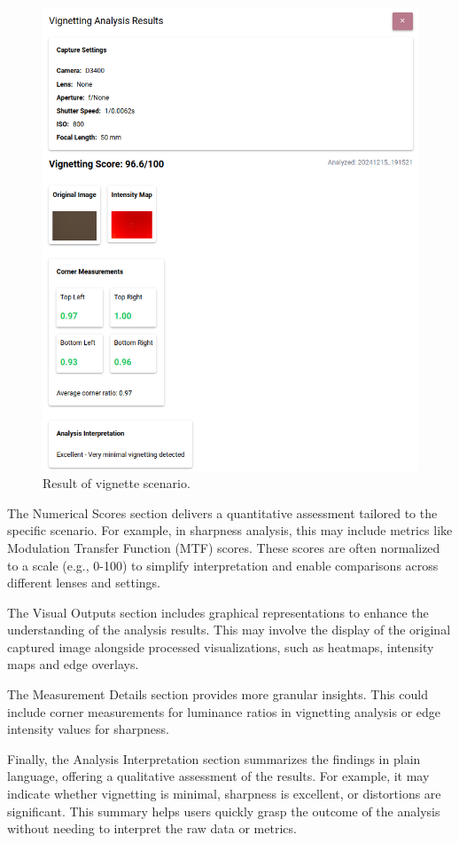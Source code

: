 \begin{figure}[hbt]
\centering
\includegraphics[height=0.8\textwidth]{Images/scenario_result.png}
\caption{Result of vignette scenario.}
\label{fig:ui_scenario_result}
\end{figure}

The Numerical Scores section delivers a quantitative assessment tailored to the specific scenario. For example, in sharpness analysis, this may include metrics like Modulation Transfer Function (MTF) scores. These scores are often normalized to a scale (e.g., 0-100) to simplify interpretation and enable comparisons across different lenses and settings.

The Visual Outputs section includes graphical representations to enhance the understanding of the analysis results. This may involve the display of the original captured image alongside processed visualizations, such as heatmaps, intensity maps and edge overlays.

The Measurement Details section provides more granular insights. This could include corner measurements for luminance ratios in vignetting analysis or edge intensity values for sharpness.

Finally, the Analysis Interpretation section summarizes the findings in plain language, offering a qualitative assessment of the results. For example, it may indicate whether vignetting is minimal, sharpness is excellent, or distortions are significant. This summary helps users quickly grasp the outcome of the analysis without needing to interpret the raw data or metrics.

